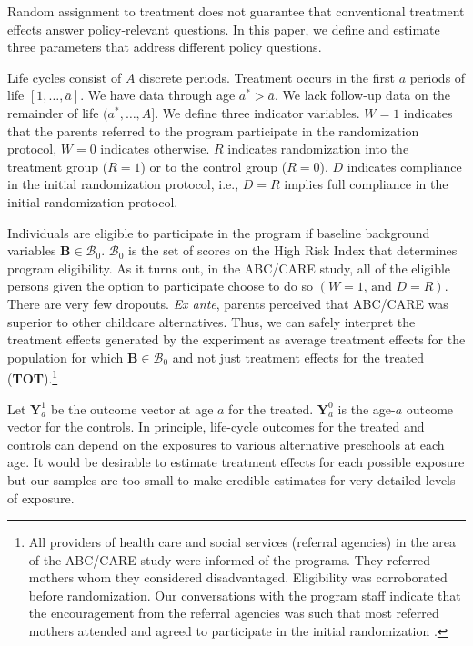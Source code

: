 Random assignment to treatment does not guarantee that conventional treatment effects answer policy-relevant questions. In this paper, we define and estimate three parameters that address different policy questions.

Life cycles consist of $A$ discrete periods. Treatment occurs in the first $\bar{a}$ periods of life $\left[1,\dots,\bar{a}\right]$. We have data through age $a^{*}>\bar{a}$. We lack follow-up data on the remainder of life $(a^*,\dots,A]$. We define three indicator variables. $W = 1$ indicates that the parents referred to the program participate in the randomization protocol, $W = 0$ indicates otherwise. $R$ indicates randomization into the treatment group ($R = 1$) or to the control group ($R = 0$). $D$ indicates compliance in the initial randomization protocol, i.e., $D = R$ implies full compliance in the initial randomization protocol.

Individuals are eligible to participate in the program if baseline background variables $\bm{B}\in\mathcal{B}_0$. $\mathcal{B}_0$ is the set of scores on the High Risk Index that determines program eligibility. As it turns out, in the ABC/CARE study, all of the eligible persons given the option to participate choose to do so $(W=1\text{, and } D=R)$. There are very few dropouts. \emph{Ex ante}, parents perceived that ABC/CARE was superior to other childcare alternatives. Thus, we can safely interpret the treatment effects generated by the experiment as average treatment effects for the population for which $\bm{B}\in\mathcal{B}_0$ and not just treatment effects for the treated (\textbf{TOT}).\footnote{All providers of health care and social services (referral agencies) in the area of the ABC/CARE study were informed of the programs. They referred mothers whom they considered disadvantaged. Eligibility was corroborated before randomization. Our conversations with the program staff indicate that the encouragement from the referral agencies was such that most referred mothers attended and agreed to participate in the initial randomization \citep{Ramey-etal_2012-ABC}.}

Let $\bm{Y}^1_a$ be the outcome vector at age $a$ for the treated. $\bm{Y}^0_a$ is the age-$a$ outcome vector for the controls. In principle, life-cycle outcomes for the treated and controls can depend on the exposures to various alternative preschools at each age. It would be desirable to estimate treatment effects for each possible exposure but our samples are too small to make credible estimates for very detailed levels of exposure.

